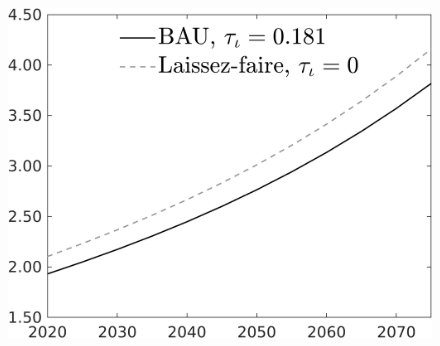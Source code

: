 \documentclass[12pt]{article}
\begin{document}
\begin{figure}[h!!]
\begin{minipage}[]{0.32\textwidth}
\end{minipage}	
\begin{minipage}[]{0.32\textwidth}
\includegraphics[width=1\textwidth]{../../codding_model/own_basedOnFried/optimalPol_010922_revision/figures/all_13Sept22/CompTaul_Equlab_LFBAU_Reg0_N_spillover0_nsk1_xgr1_knspil0_sep1_countec0_GovRev0_etaa0.79_lgd1.png}
\end{minipage}	
\end{figure}
\end{document}
